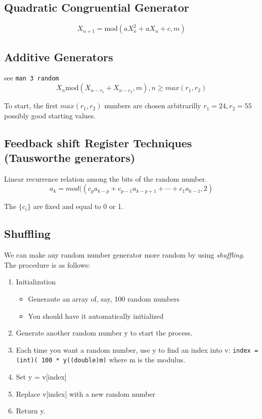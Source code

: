 \documentclass{article}
\begin{document}
\subsection{Quadratic Congruential Generator}
\[X_{n+1} = \mbox{mod}(a X_n^2 + aX_n + c, m) \]
 
\subsection{Additive Generators}
see {\tt man 3 random}
\[X_n \mbox{mod}(X_{n - r_1} + X_{n - r_2}, m), n \geq max(r_1, r_2) \]

To start, the first $max(r_1, r_2)$ numbers are chosen arbitrarilly
$r_1 = 24, r_2 = 55$ possibly good starting values.

\subsection{Feedback shift Register Techniques (Tausworthe generators)}
Linear recurrence relation among the bits of the random number.
\[ a_k = mod((c_p a_{k-p} +c_{p-1}a_{k-p+1} + \cdots + c_1 a_{k-1}, 2) \]

The $\{c_i\}$ are fixed and equal to 0 or 1.

\subsection{Shuffling}
We can make any random number generator more random by using \emph{shuffling}.
The procedure is as follows:
\begin{enumerate}
\item Initialization 
\begin{itemize}
\item Generaute an array of, say, 100 random numbers 
\item You should have it automatically initialized 
\end{itemize}
\item Generate another random number y to start the process. 
\item Each time you want a random number, use y to find an index
into v: {\tt index = (int)( 100 * y((double)m)}
where m is the modulus.
\item Set y = v[index] 
\item Replace v[index] with a new random number 
\item Return y.
\end{enumerate}
\end{document}
